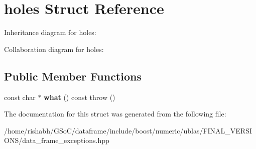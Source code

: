 \hypertarget{structholes}{}\section{holes Struct Reference}
\label{structholes}


Inheritance diagram for holes\+:


Collaboration diagram for holes\+:
\subsection*{Public Member Functions}
\begin{DoxyCompactItemize}
\item 
const char $\ast$ {\bfseries what} () const   throw ()\hypertarget{structholes_af1a6005f88f293114b3a6e99f0c93a62}{}\label{structholes_af1a6005f88f293114b3a6e99f0c93a62}

\end{DoxyCompactItemize}


The documentation for this struct was generated from the following file\+:\begin{DoxyCompactItemize}
\item 
/home/rishabh/\+G\+So\+C/dataframe/include/boost/numeric/ublas/\+F\+I\+N\+A\+L\+\_\+\+V\+E\+R\+S\+I\+O\+N\+S/data\+\_\+frame\+\_\+exceptions.\+hpp\end{DoxyCompactItemize}
